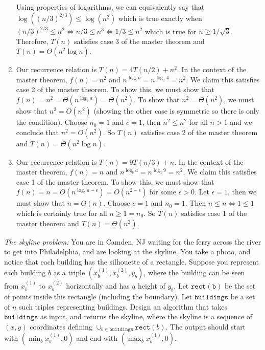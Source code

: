\documentclass{article}
\begin{document}
\begin{enumerate}
    Using properties of logarithms, we can equivalently say that $\log ((n/3)^{2/3}) \leq \log (n^2)$ which is true exactly when $(n/3)^{2/3} \leq n^2 \iff n/3 \leq n^3 \iff 1/3 \leq n^2$ which is true for $n \geq 1/\sqrt{3}$. \parspace
    Therefore, $T(n)$ satisfies case 3 of the master theorem and $T(n) = \Theta (n^2 \log n)$.
    \item Our recurrence relation is $T(n) = 4T(n/2) + n^2$.
    In the context of the master theorem, $f(n) = n^2$ and $n^{\log_b a} = n^{\log_2 4} = n^2$.
    We claim this satisfies case 2 of the master theorem.
    To show this, we must show that $f(n) = n^2 = \Theta (n^{\log_b a}) = \Theta (n^2)$. \parspace
    To show that $n^2 = \Theta (n^2)$, we must show that $n^2 = O(n^2)$ (showing the other case is symmetric so there is only the condition).
    Choose $n_0 = 1$ and $c = 1$, then $n^2 \leq n^2$ for all $n > 1$ and we conclude that $n^2 = O(n^2)$. \parspace
    So $T(n)$ satisfies case 2 of the master theorem and $T(n) = \Theta (n^2 \log n)$.
    \item Our recurrence relation is $T(n) = 9T(n/3) + n$.
    In the context of the master theorem, $f(n) = n$ and $n^{\log_b a} = n^{\log_3 9} = n^2$.
    We claim this satisfies case 1 of the master theorem.
    To show this, we must show that $f(n) = n = O(n^{\log_b a - \epsilon}) = O(n^{2 - \epsilon})$ for some $\epsilon > 0$. \parspace
    Let $\epsilon = 1$, then we must show that $n = O(n)$.
    Choose $c = 1$ and $n_0 = 1$.
    Then $n \leq n \iff 1 \leq 1$ which is certainly true for all $n \geq 1 = n_0$.
    So $T(n)$ satisfies case 1 of the master theorem and $T(n) = \Theta (n^2)$.
\end{enumerate}


\nextprob
{}

\emph{The skyline problem:} You are in Camden, NJ waiting for the ferry across the river to
get into Philadelphia, and are looking at the skyline.  You take a photo, and notice that each building
has the silhouette of a rectangle.  Suppose you  represent each building $b$ as a
triple $(x_b^{(1)},x_b^{(2)},y_b)$, where the building can be seen from $x_b^{(1)}$ to $x_b^{(2)}$
horizontally and has a height of $y_b$.  Let $\mathtt{rect(b)}$ be the set of
points inside this rectangle (including the boundary).  Let $\mathtt{buildings}$
be a set of $n$ such triples representing buildings. Design an algorithm that takes $\mathtt{buildings}$ as input, and
returns the skyline, where the skyline is a sequence of~$(x,y)$ coordinates
defining $\cup_{b \in \mathtt{buildings}} \mathtt{rect}(b)$.  The output should
start with $(\min_b{x_b^{(1)}},0)$ and end with $(\max_b{x_b^{(1)}},0)$.
\end{document}
